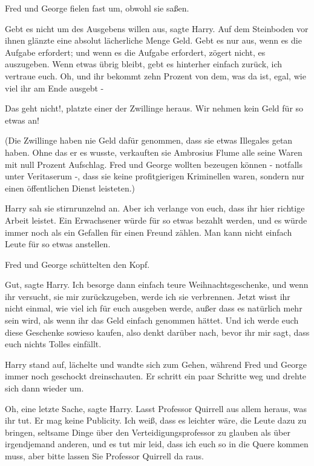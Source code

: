 Fred und George fielen fast um, obwohl sie saßen.

\glqq{}Gebt es nicht um des Ausgebens willen aus\grqq{}, sagte Harry. Auf dem
Steinboden vor ihnen glänzte eine absolut lächerliche Menge Geld. \glqq{}Gebt es
nur aus, wenn es die Aufgabe erfordert; und wenn es die Aufgabe erfordert,
zögert nicht, es auszugeben. Wenn etwas übrig bleibt, gebt es hinterher einfach
zurück, ich vertraue euch. Oh, und ihr bekommt zehn Prozent von dem, was da ist,
egal, wie viel ihr am Ende ausgebt -\grqq{}

\glqq{}Das geht nicht!\grqq{}, platzte einer der Zwillinge heraus. \glqq{}Wir
nehmen kein Geld für so etwas an!\grqq{}

(Die Zwillinge haben nie Geld dafür genommen, dass sie etwas Illegales getan
haben. Ohne das er es wusste, verkauften sie Ambrosius Flume alle seine Waren
mit null Prozent Aufschlag. Fred und George wollten bezeugen können - notfalls
unter Veritaserum -, dass sie keine profitgierigen Kriminellen waren, sondern
nur einen öffentlichen Dienst leisteten.)

Harry sah sie stirnrunzelnd an. \glqq{}Aber ich verlange von euch, dass ihr hier
richtige Arbeit leistet. Ein Erwachsener würde für so etwas bezahlt werden, und
es würde immer noch als ein Gefallen für einen Freund zählen. Man kann nicht
einfach Leute für so etwas anstellen.\grqq{}

Fred und George schüttelten den Kopf.

\glqq{}Gut\grqq{}, sagte Harry. \glqq{}Ich besorge dann einfach teure
Weihnachtsgeschenke, und wenn ihr versucht, sie mir zurückzugeben, werde ich sie
verbrennen. Jetzt wisst ihr nicht einmal, wie viel ich für euch ausgeben werde,
außer dass es natürlich mehr sein wird, als wenn ihr das Geld einfach genommen
hättet. Und ich werde euch diese Geschenke sowieso kaufen, also denkt darüber
nach, bevor ihr mir sagt, dass euch nichts Tolles einfällt.\grqq{}

Harry stand auf, lächelte und wandte sich zum Gehen, während Fred und George
immer noch geschockt dreinschauten. Er schritt ein paar Schritte weg und drehte
sich dann wieder um.

\glqq{}Oh, eine letzte Sache\grqq{}, sagte Harry. \glqq{}Lasst Professor Quirrell
aus allem heraus, was ihr tut. Er mag keine Publicity. Ich weiß, dass es
leichter wäre, die Leute dazu zu bringen, seltsame Dinge über den
Verteidigungsprofessor zu glauben als über irgendjemand anderen, und es tut mir
leid, dass ich euch so in die Quere kommen muss, aber bitte lassen Sie Professor
Quirrell da raus.\grqq{}

